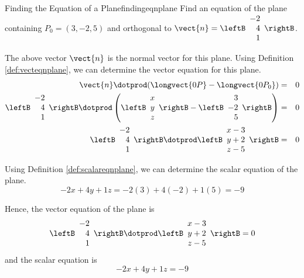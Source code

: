 \begin{example}{Finding the Equation of a Plane}{findingeqnplane}
Find an equation of the plane containing $P_0 = (3, -2, 5)$ and orthogonal to $\vect{n} = 
\leftB
\begin{array}{r}
-2 \\
4 \\
1
\end{array}
\rightB$. 
\end{example}

\begin{solution}
The above vector $\vect{n}$ is the normal vector for this plane.
Using Definition \ref{def:vecteqnplane}, we can determine the vector equation for this plane. 
\begin{eqnarray*}
\vect{n} \dotprod (\longvect{0P} - \longvect{0P_0}) &=& 0 \\
\leftB
\begin{array}{r}
-2 \\
4 \\
1
\end{array}
\rightB 
\dotprod 
\left(\leftB
\begin{array}{c}
x \\
y \\
z
\end{array}
\rightB
-
\leftB
\begin{array}{r}
3 \\
-2 \\
5
\end{array}
\rightB \right) &=& 0 \\
\leftB
\begin{array}{r}
-2 \\
4 \\
1
\end{array}
\rightB 
\dotprod 
\leftB
\begin{array}{c}
x - 3 \\
y + 2 \\
z - 5
\end{array}
\rightB
&=& 0 
\end{eqnarray*} 

Using Definition \ref{def:scalareqnplane}, we can determine the scalar equation of the plane. 
\[
-2x + 4y + 1z = -2(3) + 4(-2) + 1(5) = -9
\]

Hence, the vector equation of the plane is
\[
\leftB
\begin{array}{r}
-2 \\
4 \\
1
\end{array}
\rightB 
\dotprod 
\leftB
\begin{array}{c}
x - 3 \\
y + 2 \\
z - 5
\end{array}
\rightB
= 0 
\]
and the scalar equation is 
\[
-2x + 4y + 1z = -9
\]
\end{solution}

